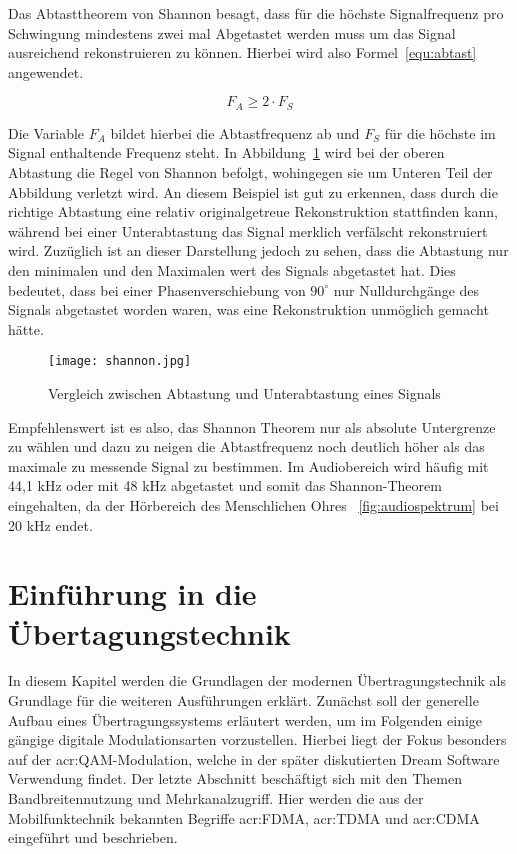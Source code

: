 Das Abtasttheorem von Shannon besagt, dass für die höchste Signalfrequenz pro Schwingung mindestens zwei mal Abgetastet werden muss um das Signal ausreichend rekonstruieren zu können. Hierbei wird also Formel~\ref{equ:abtast} angewendet.

\begin{equation}
	\label{equ:abtast}
	F_{A} \geq 2 \cdot F_{S}
\end{equation}

Die Variable $F_{A}$ bildet hierbei die Abtastfrequenz ab und $F_{S}$ für die höchste im Signal enthaltende Frequenz steht. In Abbildung~\ref{fig:shannon} wird bei der oberen Abtastung die Regel von Shannon befolgt, wohingegen sie um Unteren Teil der Abbildung verletzt wird. An diesem Beispiel ist gut zu erkennen, dass durch die richtige Abtastung eine relativ originalgetreue Rekonstruktion stattfinden kann, während bei einer Unterabtastung das Signal merklich verfälscht rekonstruiert wird. Zuzüglich ist an dieser Darstellung jedoch zu sehen, dass die Abtastung nur den minimalen und den Maximalen wert des Signals abgetastet hat. Dies bedeutet, dass bei einer Phasenverschiebung von $90^\circ$ nur Nulldurchgänge des Signals abgetastet worden waren, was eine Rekonstruktion unmöglich gemacht hätte. 

\begin{figure}[H]
	\centering
	\texttt{[image: shannon.jpg]}
	\caption[Vergleich zwischen Abtastung und Unterabtastung eines Signals]{Vergleich zwischen Abtastung und Unterabtastung eines Signals} \cite{stotzComputergestuetzteAudioUnd2019}
	\label{fig:shannon}
\end{figure}

Empfehlenswert ist es also, das Shannon Theorem nur als absolute Untergrenze zu wählen und dazu zu neigen die Abtastfrequenz noch deutlich höher als das maximale zu messende Signal zu bestimmen.\cite{stotzComputergestuetzteAudioUnd2019} Im Audiobereich wird häufig mit 44,1 kHz oder mit 48 kHz abgetastet und somit das Shannon-Theorem eingehalten, da der Hörbereich des Menschlichen Ohres ~\ref{fig:audiospektrum} bei 20 kHz endet. \cite{masteraudio}


\section{Einführung in die Übertagungstechnik}
\label{subsec:uebertragung}
In diesem Kapitel werden die Grundlagen der modernen Übertragungstechnik als Grundlage für die weiteren Ausführungen erklärt. Zunächst soll der generelle Aufbau eines Übertragungssystems erläutert werden, um im Folgenden einige gängige digitale Modulationsarten vorzustellen. Hierbei liegt der Fokus besonders auf der \gls{acr:QAM}-Modulation, welche in der später diskutierten Dream Software Verwendung findet. Der letzte Abschnitt beschäftigt sich mit den Themen Bandbreitennutzung und Mehrkanalzugriff. Hier werden die aus der Mobilfunktechnik bekannten Begriffe \gls{acr:FDMA}, \gls{acr:TDMA} und \gls{acr:CDMA} eingeführt und beschrieben.

